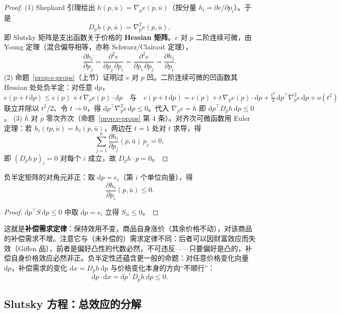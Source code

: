 \begin{proof}
(1) Shephard 引理给出 $h(p,\bar u)=\nabla_p e(p,\bar u)$（按分量 $h_i=\partial e/\partial p_i$）。于是
\[
 D_p h(p,\bar u)=\nabla^2_p e(p,\bar u),
\]
即 Slutsky 矩阵是支出函数关于价格的 \textbf{Hessian 矩阵}。$e$ 对 $p$ 二阶连续可微，由 Young 定理（混合偏导相等，亦称 Schwarz/Clairaut 定理），
\[
 \frac{\partial h_i}{\partial p_j}
 =\frac{\partial^2 e}{\partial p_j\,\partial p_i}
 =\frac{\partial^2 e}{\partial p_i\,\partial p_j}
 =\frac{\partial h_j}{\partial p_i}.
\]
(2) 命题~\ref{prop:e-props}（上节）证明过 $e$ 对 $p$ 凹。二阶连续可微的凹函数其 Hessian 处处负半定：对任意 $\mathrm dp$，
\[
 e(p+t\,\mathrm dp)\le e(p)+t\,\nabla_p e(p)\cdot\mathrm dp
 \quad\text{与}\quad
 e(p+t\,\mathrm dp)=e(p)+t\,\nabla_p e(p)\cdot\mathrm dp+\tfrac{t^2}{2}\,\mathrm dp^{\top}\nabla^2_p e\,\mathrm dp+o(t^2)
\]
联立并除以 $t^2/2$、令 $t\to0$，得 $\mathrm dp^{\top}\nabla^2_p e\,\mathrm dp\le0$。代入 $\nabla_p e=h$ 即 $\mathrm dp^{\top}D_p h\,\mathrm dp\le0$。
(3) $h$ 对 $p$ 零次齐次（命题~\ref{prop:e-props} 第 4 条）。对齐次可微函数用 Euler 定理：若 $h_i(tp,\bar u)=h_i(p,\bar u)$，两边在 $t=1$ 处对 $t$ 求导，得
\[
 \sum_{j=1}^{n}\frac{\partial h_i}{\partial p_j}(p,\bar u)\,p_j=0,
\]
即 $(D_p h\,p)_i=0$ 对每个 $i$ 成立，故 $D_p h\cdot p=0$。
\end{proof}

\begin{corollary}[补偿自身价格效应非正]\label{cor:diag}
负半定矩阵的对角元非正：取 $\mathrm dp=e_i$（第 $i$ 个单位向量），得
\[
 \frac{\partial h_i}{\partial p_i}(p,\bar u)\le0.
\]
\end{corollary}
\begin{proof}
$\mathrm dp^{\top}S\,\mathrm dp\le0$ 中取 $\mathrm dp=e_i$ 立得 $S_{ii}\le0$。
\end{proof}

这就是\textbf{补偿需求定律}：保持效用不变，商品自身涨价（其余价格不动），对该商品的补偿需求不增。注意它与（未补偿的）需求定律不同：后者可以因财富效应而失效（Giffen 品），前者是偏好凸性的代数必然，不可违反——只要偏好是凸的，补偿自身价格效应必然非正。负半定性还蕴含更一般的命题：对任意价格变化向量 $\mathrm dp$，补偿需求的变化 $\mathrm dx=D_p h\,\mathrm dp$ 与价格变化本身的方向“不顺行”：
\[
 \mathrm dp\cdot\mathrm dx=\mathrm dp^{\top}D_p h\,\mathrm dp\le0.
\]

\subsection{Slutsky 方程：总效应的分解}

